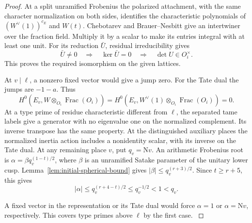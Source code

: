 \begin{proof}
At a split unramified Frobenius the polarized attachment, with the
same character normalization on both sides, identifies the
characteristic polynomials of \((W^\vee(1))^{c_E}\) and \(W(t)\).
Chebotarev and Brauer--Nesbitt give an intertwiner over the fraction
field. Multiply it by a scalar to make its entries integral with at
least one unit. For its reduction \(\bar U\), residual
irreducibility gives
\[
 \bar U\ne0\quad\Longrightarrow\quad\ker\bar U=0
 \quad\Longrightarrow\quad \det U\in O_i^\times .
\]
This proves
the required isomorphism on the given lattices.

At \(v\mid\ell\), a nonzero fixed vector would give a jump zero.
For the Tate dual the jumps are \(-1-a\). Thus
\[
        H^0(E_v,W\otimes_{O_i}\operatorname{Frac}(O_i))=
        H^0(E_v,W^\vee(1)\otimes_{O_i}\operatorname{Frac}(O_i))=0 .
\] 
At a type prime of residue characteristic different from
\(\ell\), the separated tame labels give a generator with no
eigenvalue one on the normalized complement. Its inverse transpose
has the same property. At the distinguished auxiliary places the
normalized inertia action includes a nonidentity scalar, with its
inverse on the Tate dual. 
At any remaining place \(v\), put \(q_v=\mathrm Nv\). An arithmetic Frobenius
root is \(\alpha=\beta q_v^{(1-t)/2}\), where \(\beta\) is an
unramified Satake parameter of the unitary lower cusp. Lemma~\ref{lem:initial-spherical-bound} gives
\(|\beta|\le q_v^{(r+3)/2}\). Since \(t\ge r+5\), this gives
\[
 |\alpha|\le q_v^{(r+4-t)/2}\le q_v^{-1/2}<1<q_v .
\]

A fixed vector in the representation or its Tate dual would force
\(\alpha=1\) or \(\alpha=\mathrm Nv\), respectively. This covers
type primes above \(\ell\) by the first case.
\cite{blggt-attachment,caraiani-monodromy}
\end{proof}

